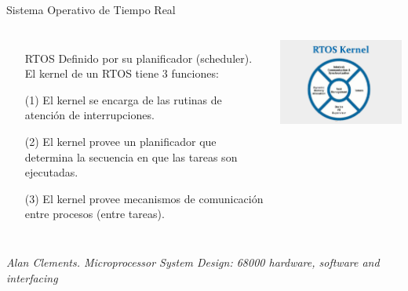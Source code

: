 \documentclass[8pt,aspectratio=169,compress]{beamer}
\begin{document}
\begin{frame}{Sistema Operativo de Tiempo Real}

   \begin{columns}[onlytextwidth,T]
     \column{\dimexpr\linewidth-50mm-5mm}

\begin{itemize}
  \item[RTOS] Definido por su planificador (scheduler). \\ El kernel de un RTOS tiene 3 funciones:

\bigskip
(1) El kernel se encarga de las rutinas de atención de interrupciones.

\bigskip
(2) El kernel provee un planificador que determina la secuencia en que las tareas son ejecutadas.

\bigskip
(3) El kernel provee mecanismos de comunicación entre procesos (entre tareas).

\bigskip
\bigskip
\end{itemize}
      \column{70mm}
    \includegraphics[width=80mm]{images/rtos.jpg}

    \end{columns}
\textit{Alan Clements. Microprocessor System Design: 68000 hardware, software and interfacing}

\end{frame}
\end{document}
